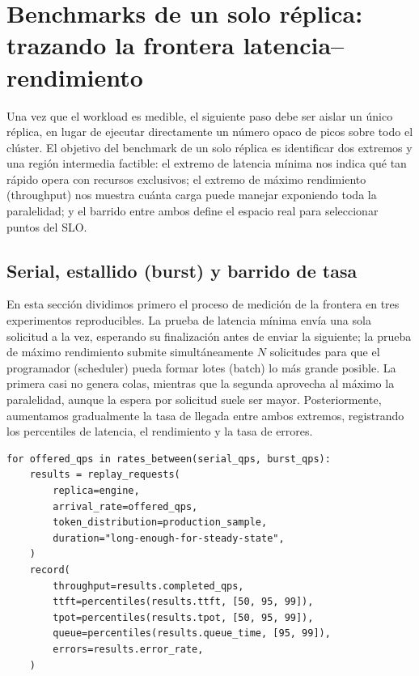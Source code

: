 \section{Benchmarks de un solo réplica: trazando la frontera latencia--rendimiento}

Una vez que el workload es medible, el siguiente paso debe ser aislar un único réplica, en lugar de ejecutar directamente un número opaco de picos sobre todo el clúster. El objetivo del benchmark de un solo réplica es identificar dos extremos y una región intermedia factible: el extremo de latencia mínima nos indica qué tan rápido opera con recursos exclusivos; el extremo de máximo rendimiento (throughput) nos muestra cuánta carga puede manejar exponiendo toda la paralelidad; y el barrido entre ambos define el espacio real para seleccionar puntos del SLO.

\subsection{Serial, estallido (burst) y barrido de tasa}

En esta sección dividimos primero el proceso de medición de la frontera en tres experimentos reproducibles. La prueba de latencia mínima envía una sola solicitud a la vez, esperando su finalización antes de enviar la siguiente; la prueba de máximo rendimiento submite simultáneamente $N$ solicitudes para que el programador (scheduler) pueda formar lotes (batch) lo más grande posible. La primera casi no genera colas, mientras que la segunda aprovecha al máximo la paralelidad, aunque la espera por solicitud suele ser mayor. Posteriormente, aumentamos gradualmente la tasa de llegada entre ambos extremos, registrando los percentiles de latencia, el rendimiento y la tasa de errores.


\begin{lstlisting}[caption={Pseudocódigo para el barrido latencia--rendimiento de un solo réplica}]
for offered_qps in rates_between(serial_qps, burst_qps):
    results = replay_requests(
        replica=engine,
        arrival_rate=offered_qps,
        token_distribution=production_sample,
        duration="long-enough-for-steady-state",
    )
    record(
        throughput=results.completed_qps,
        ttft=percentiles(results.ttft, [50, 95, 99]),
        tpot=percentiles(results.tpot, [50, 95, 99]),
        queue=percentiles(results.queue_time, [95, 99]),
        errors=results.error_rate,
    )
\end{lstlisting}

